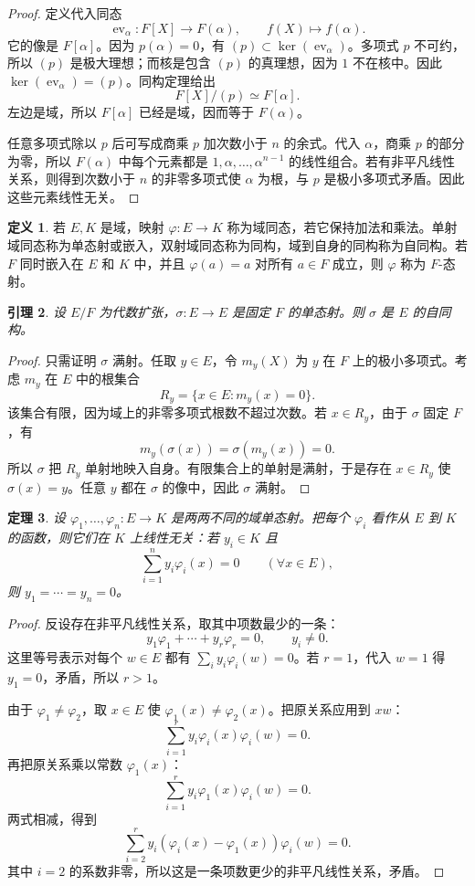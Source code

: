 \documentclass[11pt,a4paper,openany]{ctexbook}
\numberwithin{equation}{chapter}
\theoremstyle{plain}
\newtheorem{theorem}{定理}[chapter]
\newtheorem{lemma}[theorem]{引理}
\theoremstyle{definition}
\newtheorem{definition}[theorem]{定义}
\theoremstyle{remark}
\begin{document}
\begin{proof}
定义代入同态
\[
\operatorname{ev}_{\alpha}:F[X]\to F(\alpha),\qquad f(X)\mapsto f(\alpha).
\]
它的像是 $F[\alpha]$。因为 $p(\alpha)=0$，有 $(p)\subset\ker(\operatorname{ev}_{\alpha})$。多项式 $p$ 不可约，所以 $(p)$ 是极大理想；而核是包含 $(p)$ 的真理想，因为 $1$ 不在核中。因此 $\ker(\operatorname{ev}_{\alpha})=(p)$。同构定理给出
\[
F[X]/(p)\simeq F[\alpha].
\]
左边是域，所以 $F[\alpha]$ 已经是域，因而等于 $F(\alpha)$。

任意多项式除以 $p$ 后可写成商乘 $p$ 加次数小于 $n$ 的余式。代入 $\alpha$，商乘 $p$ 的部分为零，所以 $F(\alpha)$ 中每个元素都是 $1,\alpha,\dots,\alpha^{n-1}$ 的线性组合。若有非平凡线性关系，则得到次数小于 $n$ 的非零多项式使 $\alpha$ 为根，与 $p$ 是极小多项式矛盾。因此这些元素线性无关。
\end{proof}

\begin{definition}
若 $E,K$ 是域，映射 $\varphi:E\to K$ 称为域同态，若它保持加法和乘法。单射域同态称为单态射或嵌入，双射域同态称为同构，域到自身的同构称为自同构。若 $F$ 同时嵌入在 $E$ 和 $K$ 中，并且 $\varphi(a)=a$ 对所有 $a\in F$ 成立，则 $\varphi$ 称为 $F$-态射。
\end{definition}

\begin{lemma}
设 $E/F$ 为代数扩张，$\sigma:E\to E$ 是固定 $F$ 的单态射。则 $\sigma$ 是 $E$ 的自同构。
\end{lemma}

\begin{proof}
只需证明 $\sigma$ 满射。任取 $y\in E$，令 $m_y(X)$ 为 $y$ 在 $F$ 上的极小多项式。考虑 $m_y$ 在 $E$ 中的根集合
\[
R_y=\{x\in E:m_y(x)=0\}.
\]
该集合有限，因为域上的非零多项式根数不超过次数。若 $x\in R_y$，由于 $\sigma$ 固定 $F$，有
\[
m_y(\sigma(x))=\sigma(m_y(x))=0.
\]
所以 $\sigma$ 把 $R_y$ 单射地映入自身。有限集合上的单射是满射，于是存在 $x\in R_y$ 使 $\sigma(x)=y$。任意 $y$ 都在 $\sigma$ 的像中，因此 $\sigma$ 满射。
\end{proof}

\begin{theorem}
设 $\varphi_1,\dots,\varphi_n:E\to K$ 是两两不同的域单态射。把每个 $\varphi_i$ 看作从 $E$ 到 $K$ 的函数，则它们在 $K$ 上线性无关：若 $y_i\in K$ 且
\[
\sum_{i=1}^n y_i\varphi_i(x)=0\qquad(\forall x\in E),
\]
则 $y_1=\cdots=y_n=0$。
\end{theorem}

\begin{proof}
反设存在非平凡线性关系，取其中项数最少的一条：
\[
y_1\varphi_1+\cdots+y_r\varphi_r=0,\qquad y_i\ne0.
\]
这里等号表示对每个 $w\in E$ 都有 $\sum_i y_i\varphi_i(w)=0$。若 $r=1$，代入 $w=1$ 得 $y_1=0$，矛盾，所以 $r>1$。

由于 $\varphi_1\ne\varphi_2$，取 $x\in E$ 使 $\varphi_1(x)\ne\varphi_2(x)$。把原关系应用到 $xw$：
\[
\sum_{i=1}^r y_i\varphi_i(x)\varphi_i(w)=0.
\]
再把原关系乘以常数 $\varphi_1(x)$：
\[
\sum_{i=1}^r y_i\varphi_1(x)\varphi_i(w)=0.
\]
两式相减，得到
\[
\sum_{i=2}^r y_i(\varphi_i(x)-\varphi_1(x))\varphi_i(w)=0.
\]
其中 $i=2$ 的系数非零，所以这是一条项数更少的非平凡线性关系，矛盾。
\end{proof}
\end{document}
